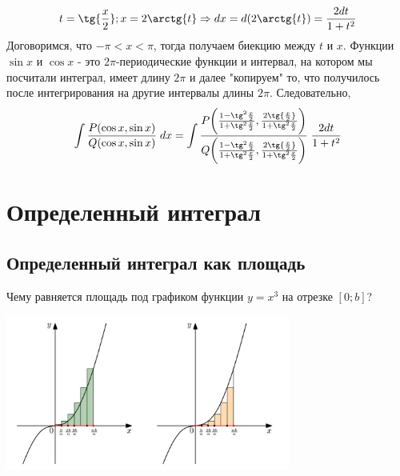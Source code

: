 	\begin{explanation}
	\[ t = \tg{\frac{x}{2}}; x = 2\arctg{t} \Rightarrow dx = d(2\arctg{t}) = \frac{2dt}{1 + t^2} \]
	Договоримся, что $-\pi < x < \pi$, тогда получаем биекцию между $t$ и $x$. Функции $\sin{x}$ и $\cos{x}$ - это $2\pi$-периодические функции и интервал, на котором мы посчитали интеграл, имеет длину $2\pi$ и далее "копируем"  то, что получилось после интегрирования на другие интервалы длины $2\pi$.
	Следовательно,
	\[ \displaystyle\int \frac{P(\cos{x}, \sin{x})}{Q(\cos{x}, \sin{x})} \; dx = \int \frac{P\bigg(\frac{1 - \tg^2{\frac{x}{2}}}{1 + \tg^2{\frac{x}{2}}}, \frac{2\tg{\frac{x}{2}}}{1 + \tg^2{\frac{x}{2}}}\bigg)}{Q\bigg(\frac{1 - \tg^2{\frac{x}{2}}}{1 + \tg^2{\frac{x}{2}}}, \frac{2\tg{\frac{x}{2}}}{1 + \tg^2{\frac{x}{2}}}\bigg)} \; \frac{2dt}{1 + t^2} \]
	\end{explanation}
	
	\chapter{Определенный интеграл}
	
	\section{Определенный интеграл как площадь}
	
	\begin{example}
		Чему равняется площадь под графиком функции
		$y = x^3$ на отрезке $[0; b]$?
		\begin{center}
			\includegraphics[width=0.7\textwidth]{img/lecture24/definite_integral}
		\end{center}
	\end{example}
	
